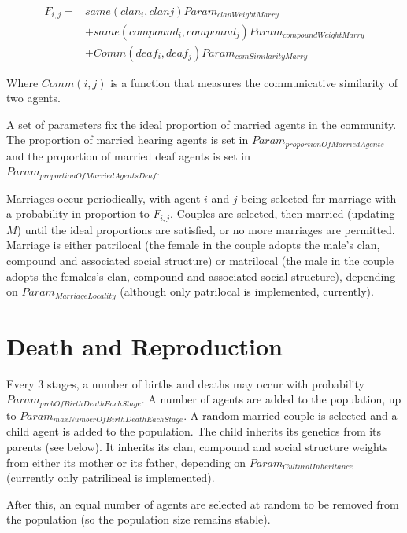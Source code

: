 \documentclass[11pt, oneside]{article}
\begin{document}
\begin{equation}
\begin{aligned}
F_{i,j} = & same(clan_{i}, clan{j})Param_{clanWeightMarry}   \\
	& + same(compound_i,compound_j)Param_{compoundWeightMarry}  \\
	& + Comm(deaf_i,deaf_j)Param_{comSimilarityMarry}
\end{aligned}
\end{equation}

Where $Comm(i,j)$ is a function that measures the communicative similarity of two agents.

A set of parameters fix the ideal proportion of married agents in the community.  The proportion of married hearing agents is set in $Param_{proportionOfMarriedAgents}$ and the proportion of married deaf agents is set in $Param_{proportionOfMarriedAgentsDeaf}$.

Marriages occur periodically, with agent $i$ and $j$ being selected for marriage with a probability in proportion to $F_{i,j}$.  Couples are selected, then married (updating $M$) until the ideal proportions are satisfied, or no more marriages are permitted.  Marriage is either patrilocal (the female in the couple adopts the male's clan, compound and associated social structure) or matrilocal (the male in the couple adopts the females's clan, compound and associated social structure), depending on $Param_{MarriageLocality}$ (although only patrilocal is implemented, currently).



\section{Death and Reproduction}

Every 3 stages, a number of births and deaths may occur with probability $Param_{probOfBirthDeathEachStage}$.  A number of agents are added to the population, up to $Param_{maxNumberOfBirthDeathEachStage}$.  A random married couple is selected and a child agent is added to the population.  The child inherits its genetics from its parents (see below).  It inherits its clan, compound and social structure weights from either its mother or its father, depending on $Param_{CulturalInheritance}$ (currently only patrilineal is implemented).

After this, an equal number of agents are selected at random to be removed from the population (so the population size remains stable).  
\end{document}
